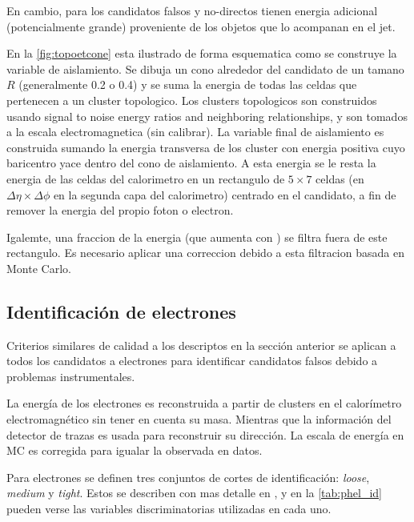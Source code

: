 En cambio, para los candidatos falsos y no-directos tienen energia adicional
(potencialmente grande) proveniente de los objetos que lo acompanan en el jet.


En la \cref{fig:topoetcone} esta ilustrado de forma esquematica como se
construye la variable de aislamiento. Se dibuja un cono alrededor del candidato
de un tamano $R$ (generalmente 0.2 o 0.4) y se suma la energia de todas las
celdas que pertenecen a un cluster topologico. Los clusters topologicos son
construidos usando signal to noise energy ratios and neighboring relationships,
y son tomados a la escala electromagnetica (sin calibrar). La variable final de
aislamiento es construida sumando la energia transversa de los cluster con
energia positiva cuyo baricentro yace dentro del cono de aislamiento. A esta
energia se le resta la energia de las celdas del calorimetro en un rectangulo de
$5\times 7$ celdas (en $\Delta\eta \times \Delta\phi$ en la segunda capa del
calorimetro) centrado en el candidato, a fin de remover la energia del propio
foton o electron.

Igalemte, una fraccion de la energia (que aumenta con {\pt}) se filtra fuera de
este rectangulo. Es necesario aplicar una correccion debido a esta filtracion
basada en Monte Carlo.







\subsection{Identificación de electrones}
\label{sec:elec_obj}

Criterios similares de calidad a los descriptos en la sección anterior
se aplican a todos los candidatos a electrones para identificar candidatos
falsos debido a problemas instrumentales.

La energía de los electrones es reconstruida a partir de clusters en el calorímetro
electromagnético sin tener en cuenta su masa. Mientras que la información del
detector de trazas es usada para reconstruir su dirección. La escala de energía
en MC es corregida para igualar la observada en datos.

Para electrones se definen tres conjuntos de cortes de identificación: \emph{loose}, \emph{medium} y
\emph{tight}. Estos se describen con mas detalle en \cite{ATL-PHYS-PUB-2011-007}, y
en la \cref{tab:phel_id} pueden verse las variables discriminatorias utilizadas
en cada uno.

